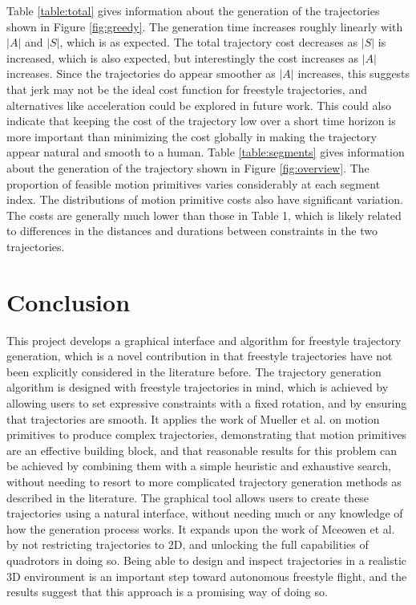 \documentclass[pageno]{jpaper}
\begin{document}
Table \ref{table:total} gives information about the generation of the trajectories shown in Figure \ref{fig:greedy}. The generation time increases roughly linearly with $|A|$ and $|S|$, which is as expected. The total trajectory cost decreases as $|S|$ is increased, which is also expected, but interestingly the cost increases as $|A|$ increases. Since the trajectories do appear smoother as $|A|$ increases, this suggests that jerk may not be the ideal cost function for freestyle trajectories, and alternatives like acceleration could be explored in future work. This could also indicate that keeping the cost of the trajectory low over a short time horizon is more important than minimizing the cost globally in making the trajectory appear natural and smooth to a human. Table \ref{table:segments} gives information about the generation of the trajectory shown in Figure \ref{fig:overview}. The proportion of feasible motion primitives varies considerably at each segment index. The distributions of motion primitive costs also have significant variation. The costs are generally much lower than those in Table 1, which is likely related to differences in the distances and durations between constraints in the two trajectories.

\section{Conclusion}

This project develops a graphical interface and algorithm for freestyle trajectory generation, which is a novel contribution in that freestyle trajectories have not been explicitly considered in the literature before. The trajectory generation algorithm is designed with freestyle trajectories in mind, which is achieved by allowing users to set expressive constraints with a fixed rotation, and by ensuring that trajectories are smooth. It applies the work of Mueller et al. on motion primitives to produce complex trajectories, demonstrating that motion primitives are an effective building block, and that reasonable results for this problem can be achieved by combining them with a simple heuristic and exhaustive search, without needing to resort to more complicated trajectory generation methods as described in the literature. The graphical tool allows users to create these trajectories using a natural interface, without needing much or any knowledge of how the generation process works. It expands upon the work of Mceowen et al. by not restricting trajectories to 2D, and unlocking the full capabilities of quadrotors in doing so. Being able to design and inspect trajectories in a realistic 3D environment is an important step toward autonomous freestyle flight, and the results suggest that this approach is a promising way of doing so.
\end{document}
